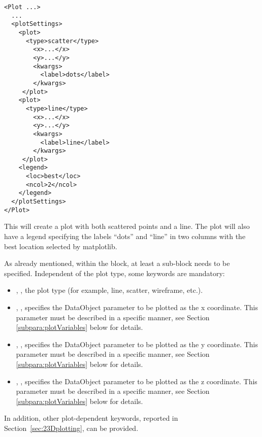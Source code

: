 \begin{lstlisting}[style=XML]
<Plot ...>
  ...
  <plotSettings>
    <plot>
      <type>scatter</type>
        <x>...</x>
        <y>...</y>
        <kwargs>
          <label>dots</label>
        </kwargs>
     </plot>
    <plot>
      <type>line</type>
        <x>...</x>
        <y>...</y>
        <kwargs>
          <label>line</label>
        </kwargs>
     </plot>
    <legend>
      <loc>best</loc>
      <ncol>2</ncol>
    </legend>
  </plotSettings>
</Plot>
\end{lstlisting}

This will create a plot with both scattered points and a line. The plot will also have a legend specifying the labels ``dots'' and ``line'' in two columns with the best location selected by matplotlib.

As already mentioned, within the  block, at least a
 sub-block needs to be specified.
%
Independent of the plot type, some keywords are mandatory:
\begin{itemize}
  \item {}, , the plot type (for
  example, line, scatter, wireframe, etc.).
  \item {}, , specifies the DataObject parameter to be plotted as the x coordinate.
	This parameter must be described in a specific manner, see Section \ref{subpara:plotVariables} below for details.
  \item {}, , specifies the DataObject parameter to be plotted as the y coordinate.
	This parameter must be described in a specific manner, see Section \ref{subpara:plotVariables} below for details.
  \item {}, , specifies the DataObject parameter to be plotted as the z coordinate.
	This parameter must be described in a specific manner, see Section \ref{subpara:plotVariables} below for details.
\end{itemize}
%
In addition, other plot-dependent keywords, reported in
Section~\ref{sec:23Dplotting}, can be provided.

